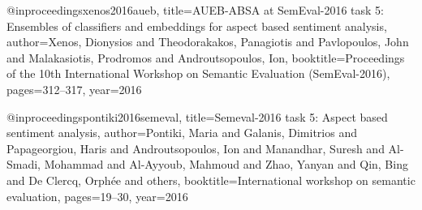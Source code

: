 @inproceedings{xenos2016aueb,
  title={AUEB-ABSA at SemEval-2016 task 5: Ensembles of classifiers and embeddings for aspect based sentiment analysis},
  author={Xenos, Dionysios and Theodorakakos, Panagiotis and Pavlopoulos, John and Malakasiotis, Prodromos and Androutsopoulos, Ion},
  booktitle={Proceedings of the 10th International Workshop on Semantic Evaluation (SemEval-2016)},
  pages={312--317},
  year={2016}
}

@inproceedings{pontiki2016semeval,
  title={Semeval-2016 task 5: Aspect based sentiment analysis},
  author={Pontiki, Maria and Galanis, Dimitrios and Papageorgiou, Haris and Androutsopoulos, Ion and Manandhar, Suresh and Al-Smadi, Mohammad and Al-Ayyoub, Mahmoud and Zhao, Yanyan and Qin, Bing and De Clercq, Orph{\'e}e and others},
  booktitle={International workshop on semantic evaluation},
  pages={19--30},
  year={2016}
}
